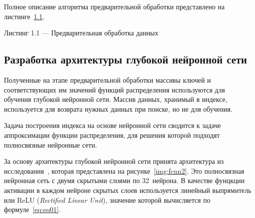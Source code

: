 Полное описание алгоритма предварительной обработки представлено на
листинге~\hyperref[alg:preprocess]{1.1}.
\pagebreak

\noindent\parbox[t]{\linewidth}{
Листинг 1.1 --- Предварительная обработка данных
}
\vspace{-1cm}
\begin{algorithm}
    \label{alg:preprocess}
    \small

\end{algorithm}

\subsection{Разработка архитектуры глубокой нейронной сети\label{dnn}}

Полученные на этапе предварительной обработки массивы ключей и соответствующих
им значений функций распределения используются для обучения глубокой нейронной
сети. Массив данных, хранимый в индексе, используется для возврата нужных
данных при поиске, но не для обучения.

Задача построения индекса на основе нейронной сети сводится к задаче
аппроксимации функции распределения, для решения которой подходят полносвязные
нейронные сети.

За основу архитектуры глубокой нейронной сети принята архитектура из
исследования~\cite{main}, которая представлена на рисунке~\ref{img:fcnn2}.  Это
полносвязная нейронная сеть с двумя скрытыми слоями по 32~нейрона.  В качестве
фунцкции активации в каждом нейроне скрытых слоев используется линейный
выпрямитель или ReLU (\textit{Rectified Linear Unit}), значение которой
вычисляется по формуле~\ref{eq:eq01}.

